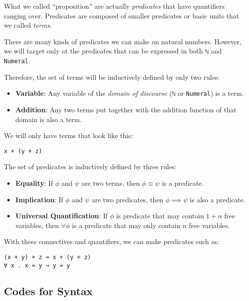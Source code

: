\documentclass[\main/thesis.tex]{subfiles}
\begin{document}
What we called ``proposition'' are actually \textit{predicates} that have
quantifiers ranging over. Predicates are composed of smaller predicates or
basic units that we called \textit{terms}.

There are many kinds of predicates we can make on natural numbers.
However, we will target only at the predicates that can be expressed in both
\lstinline|ℕ| and \lstinline|Numeral|.

Therefore, the set of terms will be inductively defined by only two rules:
\begin{itemize}
    \item \textbf{Variable}: Any variable of the \textit{domain of discourse} (\lstinline|ℕ| or
        \lstinline|Numeral|) is a term.
    \item \textbf{Addition}: Any two terms put together with the addition function of that
        domain is also a term.
\end{itemize}

We will only have terms that look like this:

\begin{lstlisting}
x + (y + z)
\end{lstlisting}

The set of predicates is inductively defined by three rules:

\begin{itemize}
    \item \textbf{Equality}: If $\phi$ and $\psi$ are two terms, then
        $ \phi \equiv \psi $ is a predicate.
    \item \textbf{Implication}: If $\phi$ and $\psi$ are two predicates, then
        $ \phi \implies \psi $ is also a predicate.
    \item \textbf{Universal Quantification}: If $\phi$ is predicate that may
        contain $ 1 + n $ free variables, then $ \forall \phi $ is a predicate that
        may only contain $ n $ free variables.
\end{itemize}

With these connectives and quantifiers, we can make predicates such as:

\begin{lstlisting}
(x + y) + z ≈ x + (y + z)
∀ x . x ≈ y → y ≈ y
\end{lstlisting}

\subsection{Codes for Syntax}
\end{document}
